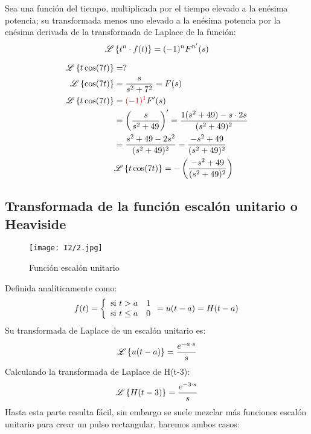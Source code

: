 \documentclass[12pt,fleqn,a4paper,oneside]{LegrandOrangeBook}
\begin{document}
\begin{theorem}[Derivada]
Sea una función del tiempo, multiplicada por el tiempo elevado a la enésima potencia; su transformada menos uno elevado a la enésima potencia por la enésima derivada de la transformada de Laplace de la función:
\begin{equation}
\mathscr{L}\left\lbrace t^n\cdot f(t)\right\rbrace=(-1)^nF^{n'}(s)
\end{equation}
\end{theorem}
\begin{example}[Derivada]
\begin{align*}
\mathscr{L}\left\lbrace t\cos(7t)\right\rbrace&=?\\
\mathscr{L}\left\lbrace \cos(7t)\right\rbrace&=\frac{s}{s^2+7^2}=F(s)\\
\mathscr{L}\left\lbrace t\cos(7t)\right\rbrace&=\textcolor{red}{(-1)^1}F'(s)\\
&=\left(\frac{s}{s^2+49}\right)'=\frac{1(s^2+49)-s\cdot 2s}{(s^2+49)^2}\\
&=\frac{s^2+49-2s^2}{(s^2+49)^2}=\frac{-s^2+49}{(s^2+49)^2}\\
&\mathscr{L}\left\lbrace t\cos(7t)\right\rbrace=\textcolor{red}{-}\left(\frac{-s^2+49}{(s^2+49)^2}\right)
\end{align*}
\end{example}
\subsection{Transformada de la función escalón unitario o Heaviside}
\begin{wrapfigure}{l}{0.5\linewidth}
  \begin{center}
    \texttt{[image: I2/2.jpg]}
  \end{center}
  \caption{Función escalón unitario}
\end{wrapfigure}
Definida analíticamente como:
\begin{equation*}
f(t) = \left\lbrace
\begin{array}{ll}
\textup{si } t>a & 1\\
\textup{si } t\leq a & 0
\end{array}=u(t-a)=H(t-a)
\right.
\end{equation*}
Su transformada de Laplace de un escalón unitario es:
\begin{displaymath}
\mathscr{L}\left\lbrace u(t-a)\right\rbrace=\frac{e^{-a\cdot s}}{s}
\end{displaymath}
Calculando la transformada de Laplace de H(t-3):
\begin{displaymath}
\mathscr{L}\left\lbrace H(t-3)\right\rbrace=\frac{e^{-3\cdot s}}{s}
\end{displaymath}
Hasta esta parte resulta fácil, sin embargo se suele mezclar más funciones escalón unitario para crear un pulso rectangular, haremos ambos casos:
\end{document}
